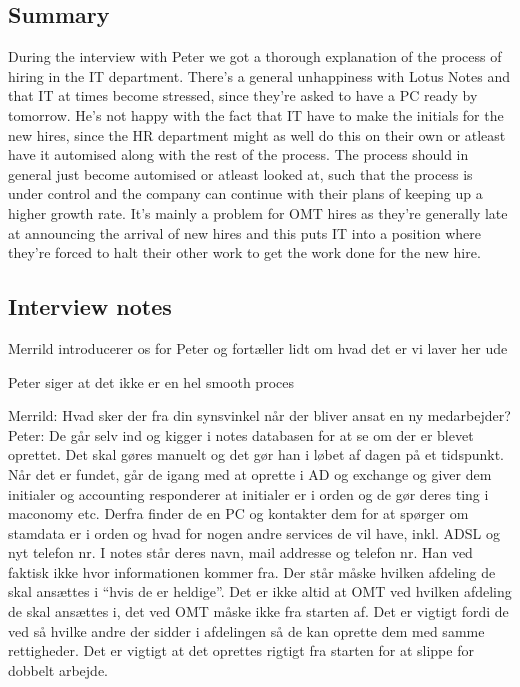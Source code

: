 \label{app:peter}
\begin{linenumbers*}
\subsection{Summary}
During the interview with Peter we got a thorough explanation of the process of hiring in the IT department. 
There's a general unhappiness with Lotus Notes and that IT at times become stressed, since they're asked to have a PC ready by tomorrow. 
He's not happy with the fact that IT have to make the initials for the new hires, since the HR department might as well do this on their own or atleast have it automised along with the rest of the process. 
The process should in general just become automised or atleast looked at, such that the process is under control and the company can continue with their plans of keeping up a higher growth rate.
It's mainly a problem for OMT hires as they're generally late at announcing the arrival of new hires and this puts IT into a position where they're forced to halt their other work to get the work done for the new hire.

\subsection{Interview notes}
Merrild introducerer os for Peter og fortæller lidt om hvad det er vi laver her ude

Peter siger at det ikke er en hel smooth proces

Merrild: Hvad sker der fra din synsvinkel når der bliver ansat en ny medarbejder?
Peter: De går selv ind og kigger i notes databasen for at se om der er blevet oprettet. Det skal gøres manuelt og det gør han i løbet af dagen på et tidspunkt.
Når det er fundet, går de igang med at oprette i AD og exchange og giver dem initialer og accounting responderer at initialer er i orden og de gør deres ting i maconomy etc.
Derfra finder de en PC og kontakter dem for at spørger om stamdata er i orden og hvad for nogen andre services de vil have, inkl. ADSL og nyt telefon nr. 
I notes står deres navn, mail addresse og telefon nr. Han ved faktisk ikke hvor informationen kommer fra. Der står måske hvilken afdeling de skal ansættes i “hvis de er heldige”.  Det er ikke altid at OMT ved hvilken afdeling de skal ansættes i, det ved OMT måske ikke fra starten af. Det er vigtigt fordi de ved så hvilke andre der sidder i afdelingen så de kan oprette dem med samme rettigheder.
Det er vigtigt at det oprettes rigtigt fra starten for at slippe for dobbelt arbejde. 


\end{linenumbers*}
